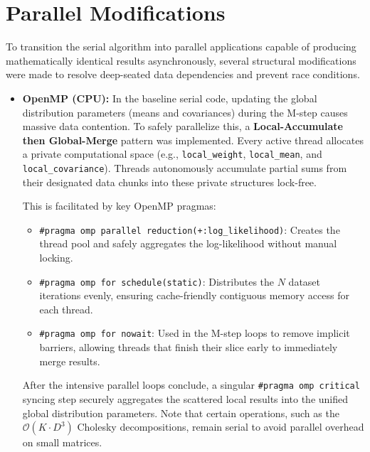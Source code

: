 \documentclass[10pt]{article}
\begin{document}
\section{Parallel Modifications}
To transition the serial algorithm into parallel applications capable of producing mathematically identical results asynchronously, several structural modifications were made to resolve deep-seated data dependencies and prevent race conditions.

\begin{itemize}
    \item \textbf{OpenMP (CPU):} In the baseline serial code, updating the global distribution parameters (means and covariances) during the M-step causes massive data contention. To safely parallelize this, a \textbf{Local-Accumulate then Global-Merge} pattern was implemented. Every active thread allocates a private computational space (e.g., \texttt{local\_weight}, \texttt{local\_mean}, and \texttt{local\_covariance}). Threads autonomously accumulate partial sums from their designated data chunks into these private structures lock-free.

    This is facilitated by key OpenMP pragmas:
    \begin{itemize}
        \item \texttt{\#pragma omp parallel reduction(+:log\_likelihood)}: Creates the thread pool and safely aggregates the log-likelihood without manual locking.
        \item \texttt{\#pragma omp for schedule(static)}: Distributes the $N$ dataset iterations evenly, ensuring cache-friendly contiguous memory access for each thread.
        \item \texttt{\#pragma omp for nowait}: Used in the M-step loops to remove implicit barriers, allowing threads that finish their slice early to immediately merge results.
    \end{itemize}
    After the intensive parallel loops conclude, a singular \texttt{\#pragma omp critical} syncing step securely aggregates the scattered local results into the unified global distribution parameters. Note that certain operations, such as the $\mathcal{O}(K \cdot D^3)$ Cholesky decompositions, remain serial to avoid parallel overhead on small matrices.


\end{itemize}
\end{document}
